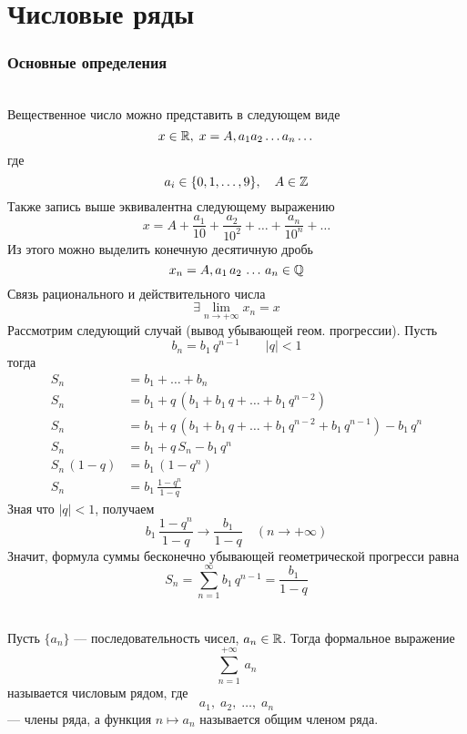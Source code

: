 \part{Числовые ряды}
\section{Основные определения}

\begin{Note}~\\
    Вещественное число можно представить в следующем виде
    \[
        x \in \mathbb{R},\; x = A,a_1a_2\dots a_n\dots
    \]
    где
    \[
         a_i \in \{0, 1, \dots, 9\}, \quad A \in \mathbb{Z}
    \]
    Также запись выше эквивалентна следующему выражению
    \[
        x = A + \frac{a_1}{10} + \frac{a_2}{10^2} + \dots + \frac{a_n}{10^n} + \dots 
    \]
    Из этого можно выделить конечную десятичную дробь  
    \[
        x_n = A,a_1\,a_2\,\dots\,a_n \in \mathbb{Q}
    \]
    Связь рационального и действительного числа
    \[
        \exists \lim_{n \rightarrow +\infty}x_n = x
    \]
    Рассмотрим следующий случай (вывод убывающей геом. прогрессии). Пусть 
    \[
        b_n = b_1\,q^{n-1} \qquad |q| < 1
    \]
    тогда
    \begin{align*}
         S_n &= b_1 + \dots + b_n\\
         S_n &= b_1 + q\,(b_1 + b_1\,q + \dots + b_1\,q^{n-2})\\
         S_n &= b_1 + q\,(b_1 + b_1\,q + \dots + b_1\,q^{n-2} + b_1\,q^{n - 1}) - b_1\,q^{n}\\
         S_n &= b_1 + q\,S_n - b_1\,q^{n}\\
         S_n\,(1 - q) &= b_1\,(1 - q^{n})\\
         S_n &= b_1\,\frac{1-q^n}{1-q}
    \end{align*}
    Зная что $|q| < 1$, получаем
    \[
        b_1\,\frac{1-q^n}{1-q} \rightarrow \frac{b_1}{1-q} \quad (n \rightarrow + \infty)
    \]
    Значит, формула суммы бесконечно убывающей геометрической прогресси равна
    \[
        S_n = \sum^{\infty}_{n = 1}b_1\,q^{n-1} = \frac{b_1}{1-q}
    \]
\end{Note}

\begin{Def}~\\
	Пусть $\{a_n\}$ --- последовательность чисел, $a_n \in \mathbb{R}$. Тогда формальное выражение 
    \[
        \sum^{+\infty}_{n = 1}\,a_n
    \] 
    называется числовым рядом, где 
    \[
        a_1,\; a_2,\; \dots,\; a_n
    \]
    --- члены ряда, а функция $n \mapsto a_n$ называется общим членом ряда.
\end{Def}

